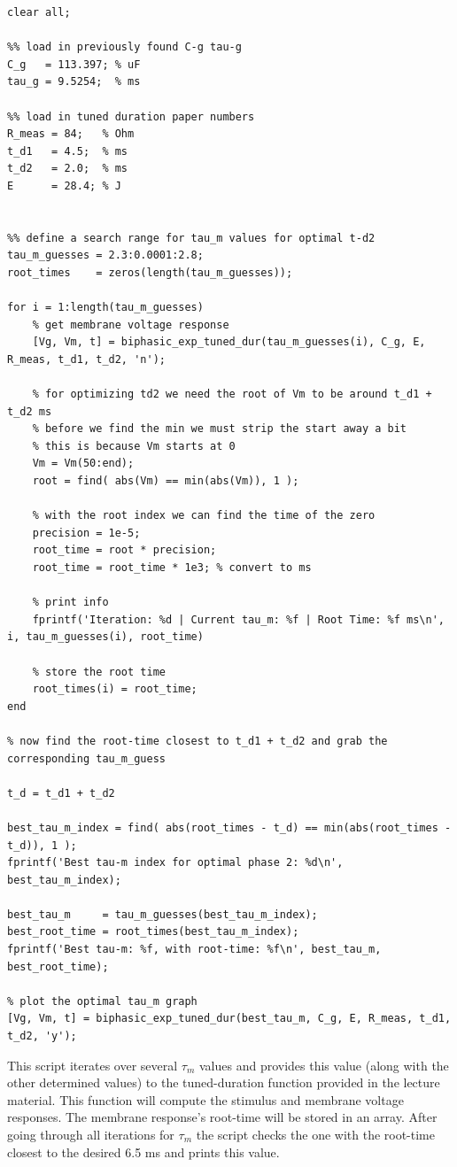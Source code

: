 \documentclass[]{report}
\begin{document}
\begin{lstlisting}[style=Matlab-editor, backgroundcolor=\color{smoky}, basicstyle=\ttfamily\tiny]
clear all;

%% load in previously found C-g tau-g
C_g   = 113.397; % uF
tau_g = 9.5254;  % ms

%% load in tuned duration paper numbers
R_meas = 84;   % Ohm
t_d1   = 4.5;  % ms
t_d2   = 2.0;  % ms
E      = 28.4; % J


%% define a search range for tau_m values for optimal t-d2
tau_m_guesses = 2.3:0.0001:2.8;
root_times    = zeros(length(tau_m_guesses));

for i = 1:length(tau_m_guesses)
	% get membrane voltage response
	[Vg, Vm, t] = biphasic_exp_tuned_dur(tau_m_guesses(i), C_g, E, R_meas, t_d1, t_d2, 'n');
	
	% for optimizing td2 we need the root of Vm to be around t_d1 + t_d2 ms
	% before we find the min we must strip the start away a bit
	% this is because Vm starts at 0
	Vm = Vm(50:end);
	root = find( abs(Vm) == min(abs(Vm)), 1 );
	
	% with the root index we can find the time of the zero
	precision = 1e-5;
	root_time = root * precision;
	root_time = root_time * 1e3; % convert to ms
	
	% print info
	fprintf('Iteration: %d | Current tau_m: %f | Root Time: %f ms\n', i, tau_m_guesses(i), root_time)
	
	% store the root time
	root_times(i) = root_time;
end

% now find the root-time closest to t_d1 + t_d2 and grab the corresponding tau_m_guess

t_d = t_d1 + t_d2

best_tau_m_index = find( abs(root_times - t_d) == min(abs(root_times - t_d)), 1 );
fprintf('Best tau-m index for optimal phase 2: %d\n', best_tau_m_index);

best_tau_m     = tau_m_guesses(best_tau_m_index);
best_root_time = root_times(best_tau_m_index);
fprintf('Best tau-m: %f, with root-time: %f\n', best_tau_m, best_root_time);

% plot the optimal tau_m graph 
[Vg, Vm, t] = biphasic_exp_tuned_dur(best_tau_m, C_g, E, R_meas, t_d1, t_d2, 'y');
\end{lstlisting}

This script iterates over several $\tau_m$ values and provides this value (along with the other determined values) to the tuned-duration function provided in the lecture material. This function will compute the stimulus and membrane voltage responses. The membrane response's root-time will be stored in an array. After going through all iterations for $\tau_m$ the script checks the one with the root-time closest to the desired 6.5 ms and prints this value.
\end{document}
